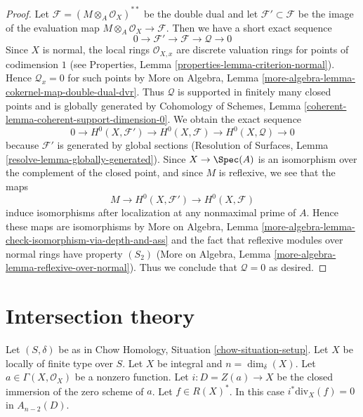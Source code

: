 \begin{proof}
Let $\mathcal{F} = (M \otimes_A \mathcal{O}_X)^{**}$ be the double dual and
let $\mathcal{F}' \subset \mathcal{F}$ be the image of the evaluation map
$M \otimes_A \mathcal{O}_X \to \mathcal{F}$. Then we have a short exact
sequence
$$
0 \to \mathcal{F}' \to \mathcal{F} \to \mathcal{Q} \to 0
$$
Since $X$ is normal, the local rings $\mathcal{O}_{X, x}$ are discrete
valuation rings for points of codimension $1$ (see
Properties, Lemma \ref{properties-lemma-criterion-normal}).
Hence $\mathcal{Q}_x = 0$ for such points by
More on Algebra, Lemma \ref{more-algebra-lemma-cokernel-map-double-dual-dvr}.
Thus $\mathcal{Q}$ is supported in finitely many closed points and is
globally generated by
Cohomology of Schemes, Lemma \ref{coherent-lemma-coherent-support-dimension-0}.
We obtain the exact sequence
$$
0 \to H^0(X, \mathcal{F}') \to H^0(X, \mathcal{F}) \to H^0(X, \mathcal{Q}) \to 0
$$
because $\mathcal{F}'$ is generated by global sections
(Resolution of Surfaces, Lemma \ref{resolve-lemma-globally-generated}).
Since $X \to \Spec(A)$ is an isomorphism over the complement of the
closed point, and since $M$ is reflexive, we see that the maps
$$
M \to H^0(X, \mathcal{F}') \to H^0(X, \mathcal{F})
$$
induce isomorphisms after localization at any nonmaximal prime of $A$.
Hence these maps are isomorphisms by More on Algebra, Lemma
\ref{more-algebra-lemma-check-isomorphism-via-depth-and-ass}
and the fact that reflexive modules over normal rings have property $(S_2)$
(More on Algebra, Lemma \ref{more-algebra-lemma-reflexive-over-normal}).
Thus we conclude that $\mathcal{Q} = 0$ as desired.
\end{proof}



\section{Intersection theory}
\label{section-intersection-theory}

\begin{lemma}
\label{lemma-gysin-factors-principal}
Let $(S, \delta)$ be as in Chow Homology, Situation \ref{chow-situation-setup}.
Let $X$ be locally of finite type over $S$.
Let $X$ be integral and $n = \dim_\delta(X)$.
Let $a \in \Gamma(X, \mathcal{O}_X)$ be a nonzero function.
Let $i : D = Z(a) \to X$ be the closed immersion of the zero scheme of $a$.
Let $f \in R(X)^*$.
In this case $i^*\text{div}_X(f) = 0$ in $A_{n - 2}(D)$.
\end{lemma}

